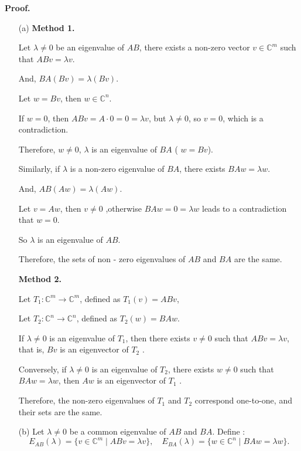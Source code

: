 \documentclass[a4paper, 11pt]{article}
\newenvironment{solution}
    {\textbf{Proof.}}
    {}
\begin{document}
\begin{solution}
\begin{enumerate}
	\item[(a)]
	 \textbf{Method 1.}
	
	Let \( \lambda \neq 0 \) be an eigenvalue of \( AB \), there exists a non-zero vector \( v \in \mathbb{C}^m \) such that \( ABv=\lambda v \).
	
	 And, \( BA(Bv)=\lambda (Bv) \).
	
	Let \( w = Bv \), then \( w \in \mathbb{C}^n \). 
	
	If \( w = 0 \), then \( ABv = A\cdot0 = 0=\lambda v \), but \( \lambda\neq0 \), so \( v = 0 \), which is a contradiction. 
	
	Therefore, \( w\neq0 \), \( \lambda \) is an eigenvalue of \( BA \) ( \( w = Bv \)).
	
	Similarly, if \( \lambda \) is a non-zero eigenvalue of \( BA \), there exists  \( BA w=\lambda w \).
	
	And, \( AB(Aw)=\lambda (Aw) \). 
	
	Let \( v = Aw \), then \( v\neq0 \) ,otherwise \( BA w = 0=\lambda w \) leads to a contradiction that \( w = 0 \). 
	
	So \( \lambda \) is an eigenvalue of \( AB \).
	
	Therefore, the sets of non - zero eigenvalues of \( AB \) and \( BA \) are the same.
	
	 \textbf{Method 2.}
	
	Let \( T_1 : \mathbb{C}^m \to \mathbb{C}^m \), defined as \( T_1(v) = ABv \),
	
	Let \( T_2 : \mathbb{C}^n \to \mathbb{C}^n \), defined as \( T_2(w) = BA w \).
	
	If \( \lambda \neq 0 \) is an eigenvalue of \( T_1 \), then there exists \( v \neq 0 \) such that \( ABv = \lambda v \), that is, \( Bv \) is an eigenvector of \( T_2 \) .
	
	Conversely, if \( \lambda \neq 0 \) is an eigenvalue of \( T_2 \), there exists \( w \neq 0 \) such that \( BA w = \lambda w \), then \( Aw \) is an eigenvector of \( T_1 \) .
	
	Therefore, the non-zero eigenvalues of \( T_1 \) and \( T_2 \) correspond one-to-one, and their sets are the same.
	
	
		\item[(b)]Let \(\lambda \neq 0\) be a common eigenvalue of \(AB\) and \(BA\). Define :
$$
	E_{AB}(\lambda) = \{ v \in \mathbb{C}^m \mid ABv = \lambda v \}, \quad E_{BA}(\lambda) = \{ w \in \mathbb{C}^n \mid BA w = \lambda w \}.
$$
	

\end{enumerate}
\end{solution}
\end{document}
